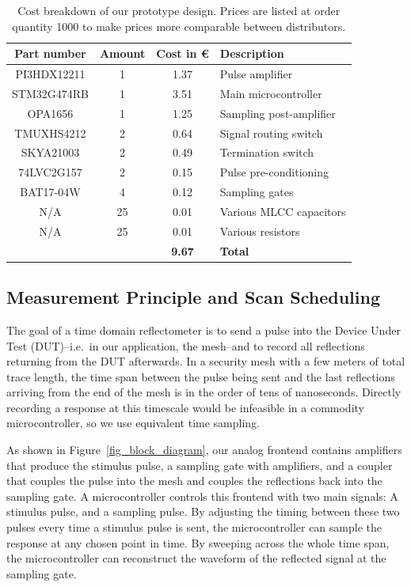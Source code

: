 \documentclass[final]{iacrtrans}
\begin{document}
\begin{table}
    \centering
    \begin{tabular}{c|c|c|l}
        \textbf{Part number}&\textbf{Amount}&\textbf{Cost in \euro}&\textbf{Description}\\\hline
        PI3HDX12211&1&1.37&Pulse amplifier\\
        STM32G474RB&1&3.51&Main microcontroller\\
        OPA1656&1&1.25&Sampling post-amplifier\\
        TMUXHS4212&2&0.64&Signal routing switch\\
        SKYA21003&2&0.49&Termination switch\\
        74LVC2G157&2&0.15&Pulse pre-conditioning\\
        BAT17-04W&4&0.12&Sampling gates\\
        N/A&25&0.01&Various MLCC capacitors\\
        N/A&25&0.01&Various resistors\\\hline
        \multicolumn{2}{r}{}&\textbf{9.67}&\textbf{Total}
    \end{tabular}
    \caption{Cost breakdown of our prototype design. Prices are listed at order quantity 1000 to make prices more
    comparable between distributors.}
    \label{tab_bom}
\end{table}

\subsection{Measurement Principle and Scan Scheduling}
\label{sec_scan_schedule}

The goal of a time domain reflectometer is to send a pulse into the Device Under Test (DUT)--i.e.\ in our application,
the mesh--and to record all reflections returning from the DUT afterwards. In a security mesh with a few meters of total
trace length, the time span between the pulse being sent and the last reflections arriving from the end of the mesh is
in the order of tens of nanoseconds. Directly recording a response at this timescale would be infeasible in a commodity
microcontroller, so we use equivalent time sampling.

As shown in Figure\ \ref{fig_block_diagram}, our analog frontend contains amplifiers that produce the stimulus pulse, a
sampling gate with amplifiers, and a coupler that couples the pulse into the mesh and couples the reflections back into
the sampling gate. A microcontroller controls this frontend with two main signals: A stimulus pulse, and a sampling
pulse. By adjusting the timing between these two pulses every time a stimulus pulse is sent, the microcontroller can
sample the response at any chosen point in time. By sweeping across the whole time span, the microcontroller can
reconstruct the waveform of the reflected signal at the sampling gate.
\end{document}
